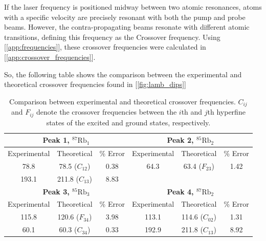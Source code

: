 \documentclass{article}
\begin{document}
If the laser frequency is positioned midway between two atomic resonances, atoms with a specific velocity are precisely resonant with both the pump and probe beams.
However, the contra-propagating beams resonate with different atomic transitions, defining this frequency as the Crossover frequency. Using [\ref{app:frequencies}], these crossover frequencies were calculated in [\ref{app:crossover_frequencies}].

\pagebreak{}

So, the following table shows the comparison between the experimental and theoretical crossover frequencies found in [\ref{fig:lamb_dips}]

\begin{table}[h]
    \centering
    \begin{tabular}{|ccc|ccc|}
    \hline
    \multicolumn{3}{|c|}{\textbf{Peak 1, $^{87}\text{Rb}_1$}} &
      \multicolumn{3}{c|}{\textbf{Peak 2, $^{85}\text{Rb}_2$}} \\ \hline
    \multicolumn{1}{|c|}{Experimental} &
      \multicolumn{1}{c|}{Theoretical} &
      \% Error &
      \multicolumn{1}{c|}{Experimental} &
      \multicolumn{1}{c|}{Theoretical} &
      \% Error \\ \hline
    \multicolumn{1}{|c|}{78.8} &
      \multicolumn{1}{c|}{78.5 ($C_{12}$)} &
      0.38 &
      \multicolumn{1}{c|}{64.3} &
      \multicolumn{1}{c|}{63.4 ($F_{23}$)} &
      1.42 \\ \hline
    \multicolumn{1}{|c|}{193.1} &
      \multicolumn{1}{c|}{211.8 ($C_{13}$)} &
      8.83 &
      \multicolumn{3}{c|}{} \\ \hline
    \multicolumn{3}{|c|}{\textbf{Peak 3, $^{85}\text{Rb}_3$}} &
      \multicolumn{3}{c|}{\textbf{Peak 4, $^{87}\text{Rb}_2$}} \\ \hline
    \multicolumn{1}{|c|}{Experimental} &
      \multicolumn{1}{c|}{Theoretical} &
      \% Error &
      \multicolumn{1}{c|}{Experimental} &
      \multicolumn{1}{c|}{Theoretical} &
      \% Error \\ \hline
    \multicolumn{1}{|c|}{115.8} &
      \multicolumn{1}{c|}{120.6 ($F_{34}$)} &
      3.98 &
      \multicolumn{1}{c|}{113.1} &
      \multicolumn{1}{c|}{114.6 ($C_{02}$)} &
      1.31 \\ \hline
    \multicolumn{1}{|c|}{60.1} &
      \multicolumn{1}{c|}{60.3 ($C_{34}$)} &
      0.33 &
      \multicolumn{1}{c|}{192.9} &
      \multicolumn{1}{c|}{211.8 ($C_{13}$)} &
      8.92 \\ \hline
    \end{tabular}
    \caption{Comparison between experimental and theoretical crossover frequencies. $C_{ij}$ and $F_{ij}$ denote the crossover frequencies between the $i$th and $j$th hyperfine states of the excited and ground states, respectively.}
\end{table}
\end{document}
